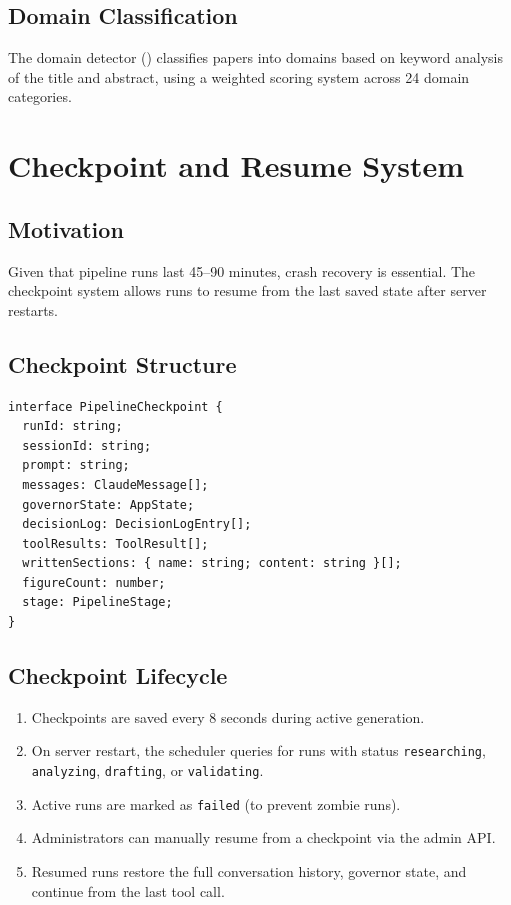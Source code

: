 \subsection{Domain Classification}

The domain detector () classifies papers into domains based on keyword analysis of the title and abstract, using a weighted scoring system across 24 domain categories.

\section{Checkpoint and Resume System}
\label{sec:pipeline:checkpoint}

\subsection{Motivation}

Given that pipeline runs last 45--90 minutes, crash recovery is essential.
The checkpoint system allows runs to resume from the last saved state after server restarts.

\subsection{Checkpoint Structure}

\begin{lstlisting}[style=typescript, caption=Pipeline checkpoint structure.]
interface PipelineCheckpoint {
  runId: string;
  sessionId: string;
  prompt: string;
  messages: ClaudeMessage[];
  governorState: AppState;
  decisionLog: DecisionLogEntry[];
  toolResults: ToolResult[];
  writtenSections: { name: string; content: string }[];
  figureCount: number;
  stage: PipelineStage;
}
\end{lstlisting}

\subsection{Checkpoint Lifecycle}

\begin{enumerate}
  \item Checkpoints are saved every 8 seconds during active generation.
  \item On server restart, the scheduler queries for runs with status \texttt{researching}, \texttt{analyzing}, \texttt{drafting}, or \texttt{validating}.
  \item Active runs are marked as \texttt{failed} (to prevent zombie runs).
  \item Administrators can manually resume from a checkpoint via the admin API.
  \item Resumed runs restore the full conversation history, governor state, and continue from the last tool call.
\end{enumerate}

